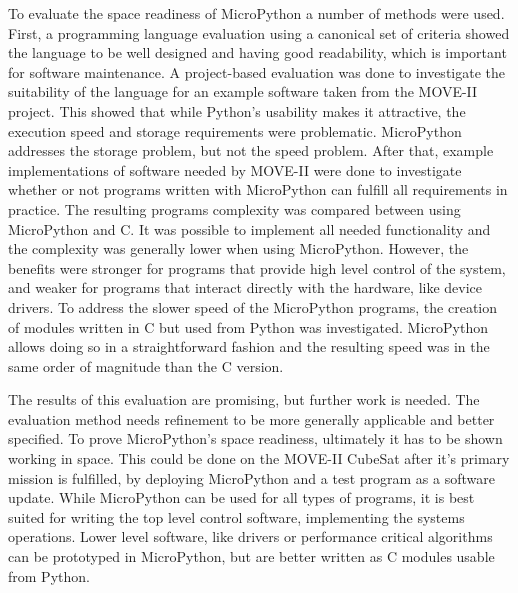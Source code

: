 To evaluate the space readiness of MicroPython a number of methods were used. First, a programming language evaluation using a canonical set of criteria showed the language to be well designed and having good readability, which is important for software maintenance. A project-based evaluation was done to investigate the suitability of the language for an example software taken from the MOVE-II project. This showed that while Python's usability makes it attractive, the execution speed and storage requirements were problematic. MicroPython addresses the storage problem, but not the speed problem. After that, example implementations of software needed by MOVE-II were done to investigate whether or not programs written with MicroPython can fulfill all requirements in practice. The resulting programs complexity was compared between using MicroPython and C. It was possible to implement all needed functionality and the complexity was generally lower when using MicroPython. However, the benefits were stronger for programs that provide high level control of the system, and weaker for programs that interact directly with the hardware, like device drivers. To address the slower speed of the MicroPython programs, the creation of modules written in C but used from Python was investigated. MicroPython allows doing so in a straightforward fashion and the resulting speed was in the same order of magnitude than the C version.

The results of this evaluation are promising, but further work is needed. The evaluation method needs refinement to be more generally applicable and better specified. To prove MicroPython's space readiness, ultimately it has to be shown working in space. This could be done on the MOVE-II CubeSat after it's primary mission is fulfilled, by deploying MicroPython and a test program as a software update. While MicroPython can be used for all types of programs, it is best suited for writing the top level control software, implementing the systems operations. Lower level software, like drivers or performance critical algorithms can be prototyped in MicroPython, but are better written as C modules usable from Python.
